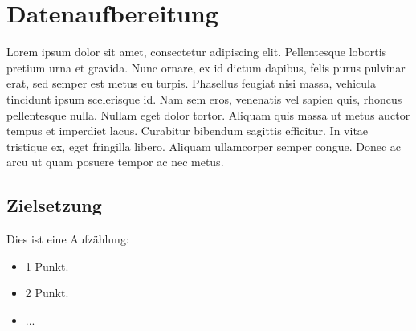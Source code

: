\clearpage
\section{Datenaufbereitung}

Lorem ipsum dolor sit amet, consectetur adipiscing elit. Pellentesque lobortis pretium urna et gravida. Nunc ornare, 
ex id dictum dapibus, felis purus pulvinar erat, sed semper est metus eu turpis. Phasellus feugiat nisi massa, vehicula 
tincidunt ipsum scelerisque id. Nam sem eros, venenatis vel sapien quis, rhoncus pellentesque nulla. Nullam eget dolor
 tortor. Aliquam quis massa ut metus auctor tempus et imperdiet lacus. Curabitur bibendum sagittis efficitur. In vitae 
 tristique ex, eget fringilla libero. Aliquam ullamcorper semper congue. Donec ac arcu ut quam posuere tempor ac nec metus.

\subsection{Zielsetzung}
Dies ist eine Aufzählung:
\begin{itemize}
    \item 1 Punkt.
    \item 2 Punkt.
    \item ...
\end{itemize}
